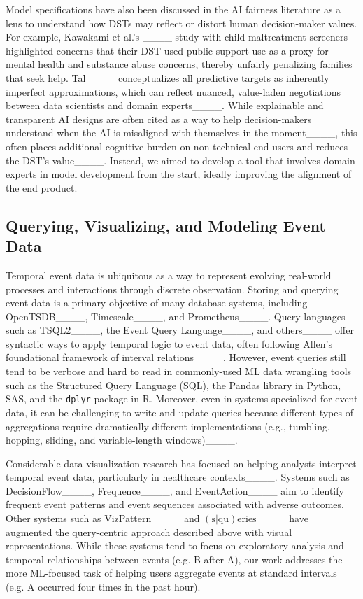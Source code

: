 Model specifications have also been discussed in the AI fairness literature as a lens to understand how DSTs may reflect or distort human decision-maker values.
For example, Kawakami et al.'s ____ study with child maltreatment screeners highlighted concerns that their DST used public support use as a proxy for mental health and substance abuse concerns, thereby unfairly penalizing families that seek help. 
Tal____ conceptualizes all predictive targets as inherently imperfect approximations, which can reflect nuanced, value-laden negotiations between data scientists and domain experts____.
While explainable and transparent AI designs are often cited as a way to help decision-makers understand when the AI is misaligned with themselves in the moment____, this often places additional cognitive burden on non-technical end users and reduces the DST's value____.
Instead, we aimed to develop a tool that involves domain experts in model development from the start, ideally improving the alignment of the end product. %

\subsection{Querying, Visualizing, and Modeling Event Data}
\label{sec:related-event-data}

Temporal event data is ubiquitous as a way to represent evolving real-world processes and interactions through discrete observation. 
Storing and querying event data is a primary objective of many database systems, including OpenTSDB____, Timescale____, and Prometheus____.
Query languages such as TSQL2____, the Event Query Language____, and others____ offer syntactic ways to apply temporal logic to event data, often following Allen's foundational framework of interval relations____.
However, event queries still tend to be verbose and hard to read in commonly-used ML data wrangling tools such as the Structured Query Language (SQL), the Pandas library in Python, SAS, and the \texttt{dplyr} package in R. 
Moreover, even in systems specialized for event data, it can be challenging to write and update queries because different types of aggregations require dramatically different implementations (e.g., tumbling, hopping, sliding, and variable-length windows)____.

Considerable data visualization research has focused on helping analysts interpret temporal event data, particularly in healthcare contexts____.
Systems such as DecisionFlow____, Frequence____, and EventAction____ aim to identify frequent event patterns and event sequences associated with adverse outcomes. 
Other systems such as VizPattern____ and $(\text{s}|\text{qu})\text{eries}$____ have augmented the query-centric approach described above with visual representations.
While these systems tend to focus on exploratory analysis and temporal relationships between events (e.g. B after A), our work addresses the more ML-focused task of helping users aggregate events at standard intervals (e.g. A occurred four times in the past hour).

